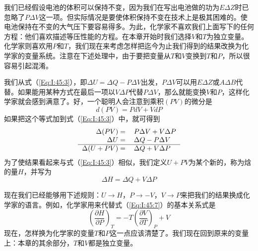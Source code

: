 我们已经假设电池的体积可以保持不变，因为我们在写出电池做的功为$E \Delta Z$时已忽略了$P \Delta V$这一项。但实际情况是要使体积保持不变在技术上是极其困难的。使电池保持在不变的大气压下要容易得多。为此，化学家不喜欢我们上面写下的任何方程：他们喜欢描述等压性能的方程。在本章开始时我们选择$V$和$T$为独立变量。化学家则喜欢用$P$和$T$，我们现在来考虑怎样把迄今为止我们得到的结果改换为化学家的变量系统。注意在下述处理中，由于要把变量从$T$和$V$变换到$T$和$P$，所以很容易引起混淆。

我们从式（\ref{Eq:I:45:3}），即$\Delta U =\Delta Q -P \Delta V$出发，$P \Delta V$可以用$E \Delta Z$或$A \Delta B$代替。如果能用某种方式在最后一项以$V \Delta P$代替$P \Delta V$，那么就能变换$V$和$P$，这样化学家就会感到满意了。好，一个聪明人会注意到乘积$(PV)$的微分是
\begin{equation*}
    d(PV) = PdV+VdP
\end{equation*}
如果把这个等式加到式（\ref{Eq:I:45:3}）中，就可得到
\begin{equation*}
    \begin{tabular}{rl}
        $\Delta(PV)=$&$P\Delta V+V\Delta P$ \\
        $\Delta U=$&$\Delta Q - P \Delta V$ \\
        \hline
        $\Delta (U + PV)=$&$\Delta Q + V\Delta P$
    \end{tabular}
\end{equation*}
为了使结果看起来与式（\ref{Eq:I:45:3}）相似，我们定义$U +PV$为某个新的，称为焓的量$H$，并写为
\begin{equation*}
    \Delta H = \Delta Q + V\Delta P
\end{equation*}

现在我们已经能够用下述规则：$U\rightarrow H$，$P \rightarrow -V$，$V\rightarrow P$来把我们的结果换成化学家的语言。例如，化学家用来代替式（\ref{Eq:I:45:7}）的基本关系式是
\begin{equation*}
    \left(\frac{\partial H}{\partial P}\right)_T = -T\left(\frac{\partial V}{\partial T}\right)_P + V
\end{equation*}
现在，怎样换为化学家的变量$T$和$P$这一点应该清楚了。我们现在回到原来的变量上：本章的其余部分，$T$和$V$都是独立变量。

